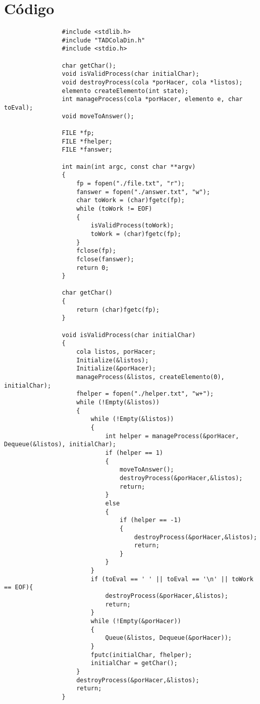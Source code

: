\documentclass[11pt,a4paper]{report}
\begin{document}
	\section{Código}
			\begin{lstlisting}
				#include <stdlib.h>
				#include "TADColaDin.h"
				#include <stdio.h>

				char getChar();
				void isValidProcess(char initialChar);
				void destroyProcess(cola *porHacer, cola *listos);
				elemento createElemento(int state);
				int manageProcess(cola *porHacer, elemento e, char toEval);
				void moveToAnswer();
				
				FILE *fp;
				FILE *fhelper;
				FILE *fanswer;
				
				int main(int argc, const char **argv)
				{
				    fp = fopen("./file.txt", "r");
				    fanswer = fopen("./answer.txt", "w");
				    char toWork = (char)fgetc(fp);
				    while (toWork != EOF)
				    {
				        isValidProcess(toWork);
				        toWork = (char)fgetc(fp);
				    }
				    fclose(fp);
				    fclose(fanswer);
				    return 0;
				}
				
				char getChar()
				{
				    return (char)fgetc(fp);
				}

				void isValidProcess(char initialChar)
				{
				    cola listos, porHacer;
				    Initialize(&listos);
				    Initialize(&porHacer);
				    manageProcess(&listos, createElemento(0), initialChar);
				    fhelper = fopen("./helper.txt", "w+");
				    while (!Empty(&listos))
				    {
				        while (!Empty(&listos))
				        {
				            int helper = manageProcess(&porHacer, Dequeue(&listos), initialChar);
				            if (helper == 1)
				            {
				                moveToAnswer();
				                destroyProcess(&porHacer,&listos);
				                return;            
				            }
				            else
				            {
				                if (helper == -1)
				                {
				                    destroyProcess(&porHacer,&listos);
				                    return;               
				                }
				            }
				        }
				        if (toEval == ' ' || toEval == '\n' || toWork == EOF){
				            destroyProcess(&porHacer,&listos);
				            return;
				        }
				        while (!Empty(&porHacer))
				        {
				            Queue(&listos, Dequeue(&porHacer));
				        }
				        fputc(initialChar, fhelper);
				        initialChar = getChar();
				    }
				    destroyProcess(&porHacer,&listos);
				    return;
				}
				

\end{lstlisting}
\end{document}
